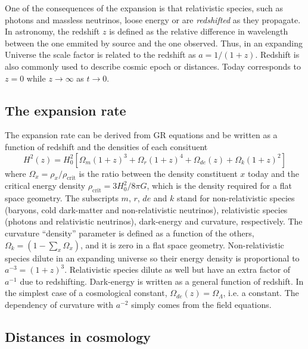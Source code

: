     One of the consequences of the expansion is that relativistic species, such 
    as photons and massless neutrinos, loose energy or are \emph{redshifted} as they 
    propagate. In astronomy, the redshift $z$ is defined as the relative difference
    in wavelength between the one emmited by source and the one observed.  
    Thus, in an expanding Universe the scale factor is related to the redshift as 
    $a = 1/(1+z)$. Redshift is also commonly used to describe cosmic epoch or distances.
    Today corresponds to $z=0$ while $z \rightarrow \infty$ as $t \rightarrow 0$. 

    \subsection{The expansion rate}

    The expansion rate can be derived from GR equations and be written as a function of 
    redshift and the densities of each consituent
    \begin{equation}
        H^2(z) = H^2_0 \left[ \Omega_m(1+z)^3 + \Omega_r (1+z)^4 + \Omega_{de}(z) + \Omega_k(1+z)^2\right]
        \label{eq:expansion_rate}
    \end{equation}
    where $\Omega_x = \rho_x / \rho_\mathrm{ crit}$ is the ratio between the density 
    constituent $x$ today and the critical energy density $\rho_\mathrm{ crit} = 3H_0^2/8\pi G$, 
    which is the density required for a flat space geometry. 
    The subscripts $m$, $r$, $de$ and $k$ stand
    for non-relativistic species (baryons, cold dark-matter and non-relativistic neutrinos), 
    relativistic species (photons and relativistic neutrinos), dark-energy and curvature, 
    respectively. The curvature ``density'' parameter is defined as a function of the others,
    $\Omega_k = (1-\sum_x \Omega_x)$, and it is zero in a flat space geometry.
    Non-relativistic species dilute in an expanding universe so their energy density is 
    proportional to $a^{-3} = (1+z)^3$. Relativistic species dilute as well but have an
    extra factor of $a^{-1}$ due to redshifting. 
    Dark-energy is written as a general function of redshift. 
    In the simplest case of a cosmological constant, $\Omega_{de}(z) = \Omega_\Lambda$, i.e. a constant.
    The dependency of curvature with $a^{-2}$ simply comes from the field equations. 

    \subsection{Distances in cosmology}

